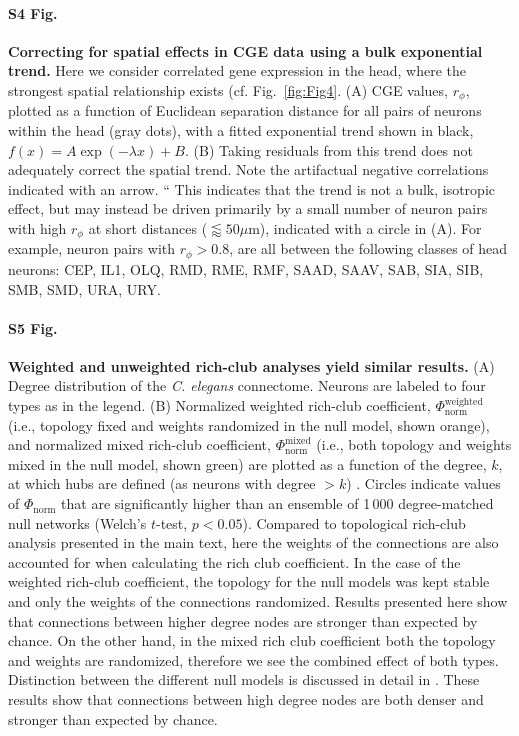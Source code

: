 \documentclass[10pt,letterpaper]{article}
\begin{document}
\paragraph*{S4 Fig.}
\label{S4_Fig}
{\bf Correcting for spatial effects in CGE data using a bulk exponential trend.}
  Here we consider correlated gene expression in the head, where the strongest spatial relationship exists (cf. Fig.~\ref{fig:Fig4}. (A) CGE values, $r_\phi$, plotted as a function of Euclidean separation distance for all pairs of neurons within the head (gray dots), with a fitted exponential trend shown in black, $f(x) = A\exp(-\lambda x) + B$.
(B) Taking residuals from this trend does not adequately correct the spatial trend.
    Note the artifactual negative correlations indicated with an arrow.
    “ This indicates that the trend is not a bulk, isotropic effect, but may instead be driven primarily by a small number of neuron pairs with high $r_\phi$ at short distances ($\lessapprox 50\mu$m), indicated with a circle in (A).
For example, neuron pairs with $r_\phi > 0.8$, are all between the following classes of head neurons: CEP, IL1, OLQ, RMD, RME, RMF, SAAD, SAAV, SAB, SIA, SIB, SMB, SMD, URA, URY.

\paragraph*{S5 Fig.}
\label{S5_Fig}
{\bf Weighted and unweighted rich-club analyses yield similar results.}
   (A) Degree distribution of the \emph{C. elegans} connectome.
    Neurons are labeled to four types as in the legend.
    (B)
    Normalized weighted rich-club coefficient, $\Phi_\mathrm{norm}^\mathrm{weighted}$ (i.e., topology fixed and weights randomized in the null model, shown orange), and
    normalized mixed rich-club coefficient, $\Phi_\mathrm{norm}^\mathrm{mixed}$ (i.e., both topology and weights mixed in the null model, shown green) are plotted as a function of the degree, $k$, at which hubs are defined (as neurons with degree $>k$) \cite{Alstott2014}.
    Circles indicate values of $\Phi_\mathrm{norm}$ that are significantly higher than an ensemble of 1\,000 degree-matched null networks (Welch's $t$-test, $p < 0.05$).
    Compared to topological rich-club analysis presented in the main text, here the weights of the connections are also accounted for when calculating the rich club coefficient.
    In the case of the weighted rich-club coefficient, the topology for the null models was kept stable and only the weights of the connections randomized. Results presented here show that connections between higher degree nodes are stronger than expected by chance.
    On the other hand, in the mixed rich club coefficient both the topology and weights are randomized, therefore we see the combined effect of both types.
    Distinction between the different null models is discussed in detail in \cite{Alstott2014}.
    These results show that connections between high degree nodes are both denser and stronger than expected by chance.
\end{document}
